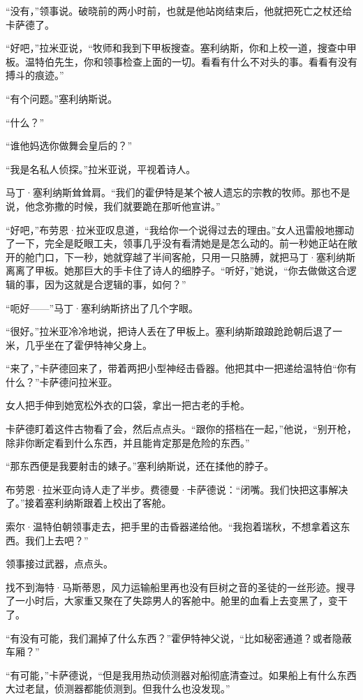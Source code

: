 \documentclass[AutoFakeBold=true]{book}
\begin{document}
``没有，''领事说。破晓前的两小时前，也就是他站岗结束后，他就把死亡之杖还给卡萨德了。

``好吧，''拉米亚说，``牧师和我到下甲板搜查。塞利纳斯，你和上校一道，搜查中甲板。温特伯先生，你和领事检查上面的一切。看看有什么不对头的事。看看有没有搏斗的痕迹。''

``有个问题。''塞利纳斯说。

``什么？''

``谁他妈选你做舞会皇后的？''

``我是名私人侦探。''拉米亚说，平视着诗人。

马丁·塞利纳斯耸耸肩。``我们的霍伊特是某个被人遗忘的宗教的牧师。那也不是说，他念弥撒的时候，我们就要跪在那听他宣讲。''

``好吧，''布劳恩·拉米亚叹息道，``我给你一个说得过去的理由。''女人迅雷般地挪动了一下，完全是眨眼工夫，领事几乎没有看清她是是怎么动的。前一秒她正站在敞开的舱门口，下一秒，她就穿越了半间客舱，只用一只胳膊，就把马丁·塞利纳斯离离了甲板。她那巨大的手卡住了诗人的细脖子。``听好，''她说，``你去做做这合逻辑的事，因为这就是合逻辑的事，如何？''

``呃好——''马丁·塞利纳斯挤出了几个字眼。

``很好。''拉米亚冷冷地说，把诗人丢在了甲板上。塞利纳斯踉踉跄跄朝后退了一米，几乎坐在了霍伊特神父身上。

``来了，''卡萨德回来了，带着两把小型神经击昏器。他把其中一把递给温特伯``你有什么？''卡萨德问拉米亚。

女人把手伸到她宽松外衣的口袋，拿出一把古老的手枪。

卡萨德盯着这件古物看了会，然后点点头。``跟你的搭档在一起，''他说，``别开枪，除非你断定看到什么东西，并且能肯定那是危险的东西。''

``那东西便是我要射击的婊子。''塞利纳斯说，还在揉他的脖子。

布劳恩·拉米亚向诗人走了半步。费德曼·卡萨德说：``闭嘴。我们快把这事解决了。''接着塞利纳斯跟着上校出了客舱。

索尔·温特伯朝领事走去，把手里的击昏器递给他。``我抱着瑞秋，不想拿着这东西。我们上去吧？''

领事接过武器，点点头。

找不到海特·马斯蒂恩，风力运输船里再也没有巨树之音的圣徒的一丝形迹。搜寻了一小时后，大家重又聚在了失踪男人的客舱中。舱里的血看上去变黑了，变干了。

``有没有可能，我们漏掉了什么东西？''霍伊特神父说，``比如秘密通道？或者隐蔽车厢？''

``有可能，''卡萨德说，``但是我用热动侦测器对船彻底清查过。如果船上有什么东西大过老鼠，侦测器都能侦测到。但我什么也没发现。''
\end{document}
